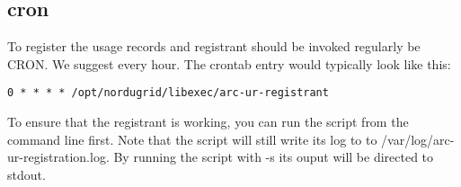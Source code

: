 \documentclass{article}
\begin{document}
\subsection{cron}

To register the usage records and registrant should be invoked regularly be
CRON. We suggest every hour. The crontab entry would typically look like this:

\begin{verbatim}
0 * * * * /opt/nordugrid/libexec/arc-ur-registrant
\end{verbatim}

To ensure that the registrant is working, you can run the script from the
command line first. Note that the script will still write its log to to
/var/log/arc-ur-registration.log. By running the script with -s its ouput will
be directed to stdout.
\end{document}
